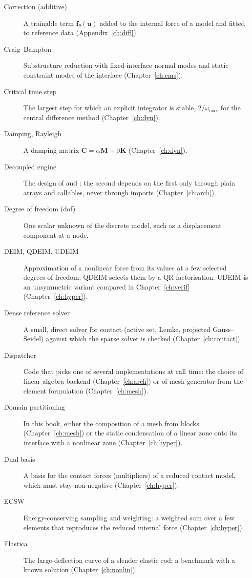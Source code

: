 \begin{description}
\item[Correction (additive)] A trainable term $\bm f_\theta(\bm u)$ added to the internal force of a model and fitted to reference data (Appendix~\ref{ch:diff}).
\item[Craig--Bampton] Substructure reduction with fixed-interface normal modes and static constraint modes of the interface (Chapter~\ref{ch:cms}).
\item[Critical time step] The largest step for which an explicit integrator is stable, $2/\omega_{\max}$ for the central difference method (Chapter~\ref{ch:dyn}).
\item[Damping, Rayleigh] A damping matrix $\bm C=\alpha\bm M+\beta\bm K$ (Chapter~\ref{ch:dyn}).
\item[Decoupled engine] The design of \fea{} and \rom{}: the second depends on the first only through plain arrays and callables, never through imports (Chapter~\ref{ch:arch}).
\item[Degree of freedom (dof)] One scalar unknown of the discrete model, such as a displacement component at a node.
\item[DEIM, QDEIM, UDEIM] Approximation of a nonlinear force from its values at a few selected degrees of freedom; QDEIM selects them by a QR factorisation, UDEIM is an unsymmetric variant compared in Chapter~\ref{ch:verif} (Chapter~\ref{ch:hyper}).
\item[Dense reference solver] A small, direct solver for contact (active set, Lemke, projected Gauss--Seidel) against which the sparse solver is checked (Chapter~\ref{ch:contact}).
\item[Dispatcher] Code that picks one of several implementations at call time: the choice of linear-algebra backend (Chapter~\ref{ch:arch}) or of mesh generator from the element formulation (Chapter~\ref{ch:mesh}).
\item[Domain partitioning] In this book, either the composition of a mesh from blocks (Chapter~\ref{ch:mesh}) or the static condensation of a linear zone onto its interface with a nonlinear zone (Chapter~\ref{ch:hyper}).
\item[Dual basis] A basis for the contact forces (multipliers) of a reduced contact model, which must stay non-negative (Chapter~\ref{ch:hyper}).
\item[ECSW] Energy-conserving sampling and weighting: a weighted sum over a few elements that reproduces the reduced internal force (Chapter~\ref{ch:hyper}).
\item[Elastica] The large-deflection curve of a slender elastic rod; a benchmark with a known solution (Chapter~\ref{ch:nonlin}).

\end{description}
